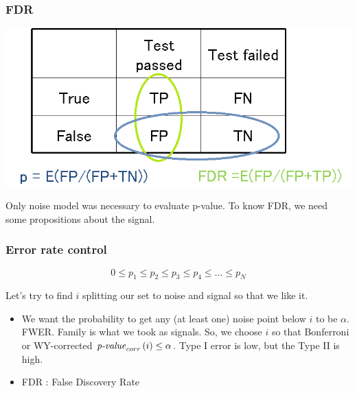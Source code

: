 \documentclass{beamer}
\newcommand{\pval}{\text{\textit{p-value}}}
\begin{document}
	\begin{frame}
		\frametitle{FDR}
		\begin{center}
			\includegraphics[scale=0.5]{FDR}
		\end{center}
		Only noise model was necessary to evaluate p-value. To know FDR, we need some propositions about the signal.
	\end{frame}

	\begin{frame}
		\frametitle{Error rate control}
		$$0 \leq p_1 \leq p_2 \leq p_3 \leq p_4 \leq \ldots \leq p_N$$

		Let's try to find $i$ splitting our set to noise and signal so that we like it.

		\begin{itemize}
		\item We want the probability to get any (at least one) noise point below $i$ to be $\alpha$. FWER. Family is what we took as signals. So, we choose $i$ so that Bonferroni or WY-corrected $\pval_{corr}\left(i\right)\leq \alpha$. Type I error is low, but the Type II is high.  
		\item FDR : False Discovery Rate
		\end{itemize}
	\end{frame}

\end{document}
